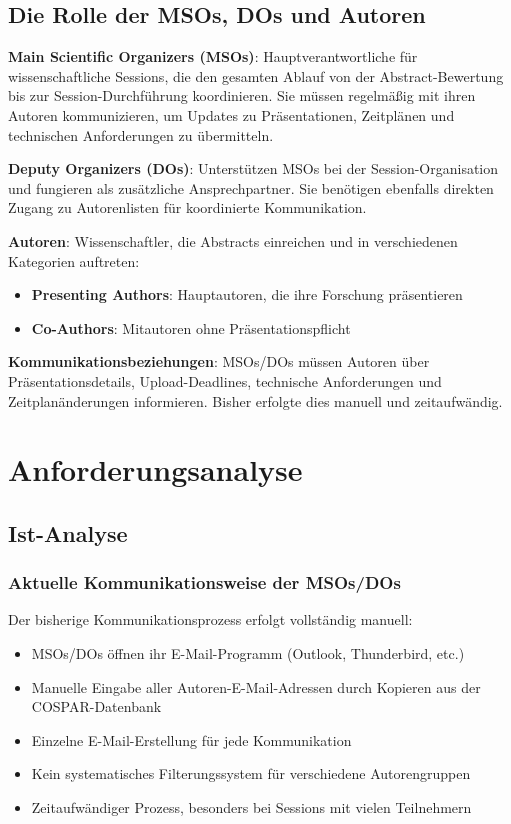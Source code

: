 \documentclass[11pt,a4paper]{article}
\begin{document}
\subsection{Die Rolle der MSOs, DOs und Autoren}
\textbf{Main Scientific Organizers (MSOs)}: Hauptverantwortliche für wissenschaftliche Sessions, die den gesamten Ablauf von der Abstract-Bewertung bis zur Session-Durchführung koordinieren. Sie müssen regelmäßig mit ihren Autoren kommunizieren, um Updates zu Präsentationen, Zeitplänen und technischen Anforderungen zu übermitteln.

\textbf{Deputy Organizers (DOs)}: Unterstützen MSOs bei der Session-Organisation und fungieren als zusätzliche Ansprechpartner. Sie benötigen ebenfalls direkten Zugang zu Autorenlisten für koordinierte Kommunikation.

\textbf{Autoren}: Wissenschaftler, die Abstracts einreichen und in verschiedenen Kategorien auftreten:
\begin{itemize}
    \item \textbf{Presenting Authors}: Hauptautoren, die ihre Forschung präsentieren
    \item \textbf{Co-Authors}: Mitautoren ohne Präsentationspflicht
\end{itemize}

\textbf{Kommunikationsbeziehungen}: MSOs/DOs müssen Autoren über Präsentationsdetails, Upload-Deadlines, technische Anforderungen und Zeitplanänderungen informieren. Bisher erfolgte dies manuell und zeitaufwändig.

\newpage

\section{Anforderungsanalyse}

\subsection{Ist-Analyse}

\subsubsection{Aktuelle Kommunikationsweise der MSOs/DOs}
Der bisherige Kommunikationsprozess erfolgt vollständig manuell:
\begin{itemize}
    \item MSOs/DOs öffnen ihr E-Mail-Programm (Outlook, Thunderbird, etc.)
    \item Manuelle Eingabe aller Autoren-E-Mail-Adressen durch Kopieren aus der COSPAR-Datenbank
    \item Einzelne E-Mail-Erstellung für jede Kommunikation
    \item Kein systematisches Filterungssystem für verschiedene Autorengruppen
    \item Zeitaufwändiger Prozess, besonders bei Sessions mit vielen Teilnehmern
\end{itemize}
\end{document}
